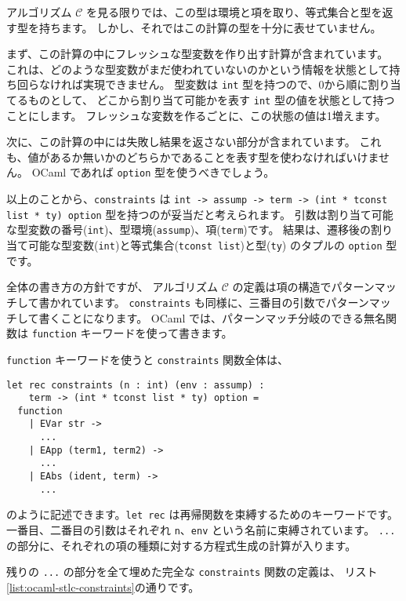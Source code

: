 アルゴリズム $\mathcal C$ を見る限りでは、この型は環境と項を取り、等式集合と型を返す型を持ちます。
しかし、それではこの計算の型を十分に表せていません。

まず、この計算の中にフレッシュな型変数を作り出す計算が含まれています。
これは、どのような型変数がまだ使われていないのかという情報を状態として持ち回らなければ実現できません。
型変数は \texttt{int} 型を持つので、0から順に割り当てるものとして、
どこから割り当て可能かを表す \texttt{int} 型の値を状態として持つことにします。
フレッシュな変数を作るごとに、この状態の値は1増えます。

次に、この計算の中には失敗し結果を返さない部分が含まれています。
これも、値があるか無いかのどちらかであることを表す型を使わなければいけません。
OCaml であれば \texttt{option} 型を使うべきでしょう。

以上のことから、\texttt{constraints} は
\texttt{int -> assump -> term -> (int * tconst list * ty) option} 型を持つのが妥当だと考えられます。
引数は割り当て可能な型変数の番号(\texttt{int})、型環境(\texttt{assump})、項(\texttt{term})です。
結果は、遷移後の割り当て可能な型変数(\texttt{int})と等式集合(\texttt{tconst list})と型(\texttt{ty})
のタプルの \texttt{option} 型です。

全体の書き方の方針ですが、
アルゴリズム $\mathcal C$ の定義は項の構造でパターンマッチして書かれています。
\texttt{constraints} も同様に、三番目の引数でパターンマッチして書くことになります。
OCaml では、パターンマッチ分岐のできる無名関数は \texttt{function} キーワードを使って書きます。

\texttt{function} キーワードを使うと \texttt{constraints} 関数全体は、
\begin{lstlisting}
let rec constraints (n : int) (env : assump) :
    term -> (int * tconst list * ty) option =
  function
    | EVar str ->
      ...
    | EApp (term1, term2) ->
      ...
    | EAbs (ident, term) ->
      ...
\end{lstlisting}
のように記述できます。\texttt{let rec} は再帰関数を束縛するためのキーワードです。
一番目、二番目の引数はそれぞれ \texttt{n}、\texttt{env} という名前に束縛されています。
\texttt{...} の部分に、それぞれの項の種類に対する方程式生成の計算が入ります。

残りの \texttt{...} の部分を全て埋めた完全な \texttt{constraints} 関数の定義は、
リスト\ref{list:ocaml-stlc-constraints}の通りです。

